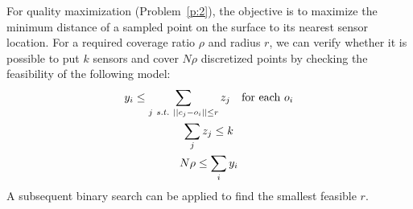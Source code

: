 For quality maximization (Problem~\ref{p:2}), the objective is to maximize 
the minimum distance of a sampled point on the surface to its nearest sensor 
location. 
For a required coverage ratio $\rho$ and radius $r$, we can verify whether it is possible to put $k$ sensors and cover $N\rho$ discretized points by checking the 
feasibility of the following model:
\begin{gather}
    y_i \leq \sum_{j\ s.t.\ ||c_j - o_i|| \leq r}  z_j \text{\quad for each } o_i\\
    \sum_j z_j \leq k\\
    N \rho \leq \sum_i y_i 
\end{gather}
A subsequent binary search can be applied to find the smallest feasible $r$. 

